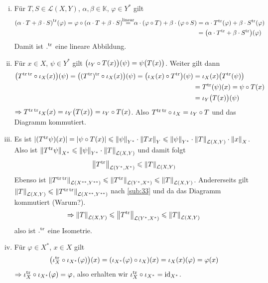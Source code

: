 \begin{enumerate}[(i)]
	\item Für $T,S \in \mathcal{L}(X,Y)$, $\alpha, \beta \in \mathds{K}$, $\varphi \in Y^*$ gilt
	\begin{align*}
		\enbrace*{\alpha \cdot T + \beta \cdot S}^\tr (\varphi) = \varphi \circ \enbrace*{\alpha \cdot T + \beta \cdot S} \!\!\stackrel{\text{linear}}{=} \!\!
		\alpha \cdot (\varphi \circ T) + \beta \cdot (\varphi \circ S)  &= \alpha \cdot T^\tr(\varphi) + \beta \cdot S^\tr(\varphi)\\
		&= \enbrace*{\alpha \cdot T^\tr + \beta \cdot S^\tr}(\varphi) 
	\end{align*}
	Damit ist $.^\tr$ eine lineare Abbildung.
	\item Für $x \in X$, $\psi \in Y^*$ gilt $\enbrace[\big]{\iota_Y \circ T(x)}(\psi) = \psi \enbrace[\big]{T(x)}$. Weiter gilt dann
	\begin{align*}
		\enbrace[\big]{T^{\tr \, \tr} \circ \iota_X(x)} (\psi) = \enbrace[\big]{(T^\tr)^\tr \circ \iota_X(x)}(\psi)  = \enbrace[\big]{\iota_X(x) \circ  T^\tr}(\psi)
		&= \iota_X(x) \enbrace*{T^\tr(\psi)}  \\
		&= T^\tr(\psi)(x) = \psi \circ T(x) \\
		&= \iota_Y \enbrace[\big]{T(x)} (\psi) 
	\end{align*}
	$\Rightarrow T^{\tr \, \tr} \iota_X(x) = \iota_Y \enbrace[\big]{T(x)} = \iota_Y \circ T (x)$. Also $T^{\tr \, \tr} \circ \iota_X = \iota_Y  \circ T$ und 
	das Diagramm kommutiert.
	\item Es ist $\abs{(T^\tr \psi)(x)} = \abs*{\psi \circ T(x)} \le \norm[Y^*]{\psi} \cdot \norm[Y]{T x} \le \norm[Y^*]{\psi} \cdot \norm[\mathcal{L}(X,Y)]{T} \cdot \norm[X]{x}$. Also
	ist $\norm[X^*]{T^\tr \psi} \le  \norm[Y^*]{\psi} \cdot  \norm[\mathcal{L}(X,Y)]{T}$ und damit folgt 
	\[
		\norm[\mathcal{L}(Y^*,X^*)]{T^\tr} \le \norm[\mathcal{L}(X,Y)]{T}  
	\]
	Ebenso ist $\norm[\mathcal{L}(X^{**},Y^{**})]{T^{\tr \, \tr}} \le \norm[\mathcal{L}(Y^*,X^*)]{T^\tr} \le \norm[\mathcal{L}(X,Y)]{T}$. Andererseits gilt 
	$\norm[\mathcal{L}(X,Y)]{T} \le \norm[\mathcal{L}(X^{**},Y^{**})]{T^{\tr\, \tr}}$ nach \ref{sub:33} und da das Diagramm kommutiert (Warum?). 
	\[
		\Rightarrow \norm[\mathcal{L}(X,Y)]{T} \le \norm[\mathcal{L}(Y^*,X^*)]{T^\tr}  \le  \norm[\mathcal{L}(X,Y)]{T} 
	\]
	also ist $.^\tr$ eine Isometrie.
	\item Für $\varphi \in X^*$, $x \in X$ gilt
	\begin{align*}
		\enbrace[\big]{\iota_X^\tr \circ \iota_{X^*} (\varphi)} (x) = (\iota_{X^*}(\varphi) \circ \iota_X)(x) = \iota_X(x)(\varphi) = \varphi(x)
	\end{align*}
	$\Rightarrow \iota_X^\tr \circ \iota_{X^*}(\varphi)= \varphi$, also erhalten wir $\iota_X^\tr \circ  \iota_{X^*} = \id_{X^*}$. \bewende 
\end{enumerate}

